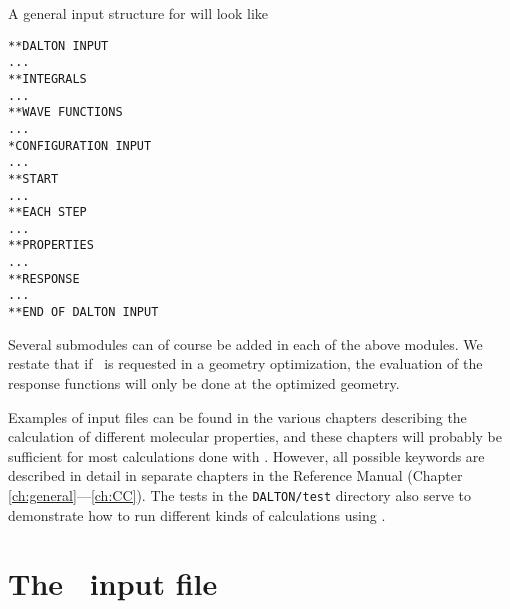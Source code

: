 A general input structure for {\dalton} will look like

\begin{verbatim}
**DALTON INPUT
...
**INTEGRALS
...
**WAVE FUNCTIONS
...
*CONFIGURATION INPUT
...
**START
...
**EACH STEP
...
**PROPERTIES
...
**RESPONSE
...
**END OF DALTON INPUT
\end{verbatim}

Several submodules can of course be added in each of the above
modules. We restate that if \resp\ is requested in a geometry
optimization, the evaluation of the response functions will only be
done at the optimized geometry.

Examples of input files can be found in the various chapters
describing the calculation of different molecular properties, and
these chapters will probably be sufficient for most calculations done
with {\dalton}. However, all possible keywords are described in detail
in separate chapters in the Reference Manual (Chapter \ref{ch:general}---\ref{ch:CC}). The tests in the
\verb|DALTON/test| directory also serve to demonstrate how to run
different kinds of calculations using {\dalton}.

\section{The \potinp\ input file}

